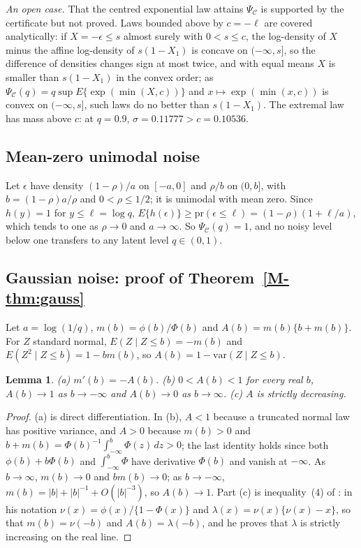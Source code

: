 \documentclass[12pt]{article}
\renewcommand{\_}{\usc\allowbreak}
\newtheorem{lemma}{Lemma}
\theoremstyle{definition}
\numberwithin{equation}{section}
\newcommand{\pr}{\mathrm{pr}}
\newcommand{\E}{\mathcal{C}}
\newcommand{\var}{\mathrm{var}}
\begin{document}
\emph{An open case.} That the centred exponential law attains $\Psi_{\E}$ is supported by the certificate but not proved. Laws bounded above by $c = -\ell$ are covered analytically: if $X = -\epsilon \le s$ almost surely with $0 < s \le c$, the log-density of $X$ minus the affine log-density of $s(1 - X_1)$ is concave on $(-\infty, s]$, so the difference of densities changes sign at most twice, and with equal means $X$ is smaller than $s(1 - X_1)$ in the convex order; as $\Psi_{\E}(q) = q\sup E\{\exp(\min(X, c))\}$ and $x \mapsto \exp(\min(x, c))$ is convex on $(-\infty, s]$, such laws do no better than $s(1 - X_1)$. The extremal law has mass above $c$: at $q = 0.9$, $\sigma = 0.11777 > c = 0.10536$.

\subsection{Mean-zero unimodal noise}\label{sec:s-mzu}

Let $\epsilon$ have density $(1 - \rho)/a$ on $[-a, 0]$ and $\rho/b$ on $(0, b]$, with $b = (1 - \rho)a/\rho$ and $0 < \rho \le 1/2$; it is unimodal with mean zero. Since $h(y) = 1$ for $y \le \ell = \log q$, $E\{h(\epsilon)\} \ge \pr(\epsilon \le \ell) = (1 - \rho)(1 + \ell/a)$, which tends to one as $\rho \to 0$ and $a \to \infty$. So $\Psi_{\E}(q) = 1$, and no noisy level below one transfers to any latent level $q \in (0, 1)$.

\subsection{Gaussian noise: proof of Theorem~\ref{M-thm:gauss}}\label{sec:s-gauss-exact}

Let $a = \log(1/q)$, $m(b) = \phi(b)/\Phi(b)$ and $A(b) = m(b)\{b + m(b)\}$. For $Z$ standard normal, $E(Z \mid Z \le b) = -m(b)$ and $E(Z^2 \mid Z \le b) = 1 - bm(b)$, so $A(b) = 1 - \var(Z \mid Z \le b)$.

\begin{lemma}\label{lem:sampford}
(a) $m'(b) = -A(b)$. (b) $0 < A(b) < 1$ for every real $b$, $A(b) \to 1$ as $b \to -\infty$ and $A(b) \to 0$ as $b \to \infty$. (c) $A$ is strictly decreasing.
\end{lemma}

\begin{proof}
(a) is direct differentiation. In (b), $A < 1$ because a truncated normal law has positive variance, and $A > 0$ because $m(b) > 0$ and $b + m(b) = \Phi(b)^{-1}\int_{-\infty}^b\Phi(z)\,dz > 0$; the last identity holds since both $\phi(b) + b\Phi(b)$ and $\int_{-\infty}^b\Phi$ have derivative $\Phi(b)$ and vanish at $-\infty$. As $b \to \infty$, $m(b) \to 0$ and $bm(b) \to 0$; as $b \to -\infty$, $m(b) = |b| + |b|^{-1} + O(|b|^{-3})$, so $A(b) \to 1$. Part (c) is inequality~(4) of \citet{sampford1953}: in his notation $\nu(x) = \phi(x)/\{1 - \Phi(x)\}$ and $\lambda(x) = \nu(x)\{\nu(x) - x\}$, so that $m(b) = \nu(-b)$ and $A(b) = \lambda(-b)$, and he proves that $\lambda$ is strictly increasing on the real line.
\end{proof}
\end{document}
